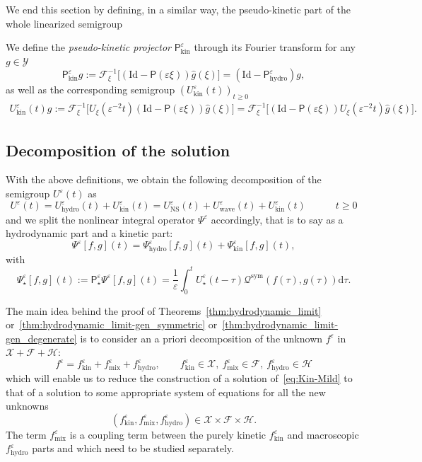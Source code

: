 \documentclass[AHL,Unicode,longabstracts,published]{cedram}
\newcommand{\ns}{\mathrm{NS}}
\newcommand{\hyd}{\mathrm{hydro}}
\newcommand{\mix}{\mathrm{mix}}
\newcommand{\kin}{\mathrm{kin}}
\newcommand{\sym}{\mathrm{sym}}
\newcommand{\Id}{\mathrm{Id}}
\renewcommand{\d}{\mathrm{d}}
\newcommand{\Wave}{\mathrm{wave}}
\newcommand{\FF}{\mathcal{F}}
\newcommand{\PP}{\mathsf{P}}
\newcommand{\QQ}{\mathcal{Q}}
\newcommand{\VV}{\mathcal{Y}}
\newcommand{\FFF}{\mathscr{F}}
\newcommand{\HHH}{\mathscr{H}}
\newcommand{\GGG}{\mathscr{X}}
\newcommand{\SSSs}{\HHH}
\newcommand{\SSSl}{\GGG}
\newcommand{\SSSm}{\FFF}
\newcommand{\SSg}{\VV}
\renewcommand*\ge{\geqslant}
\newcommand*\eps{{\varepsilon}}
\begin{document}
We end this section by defining, in a similar way, the pseudo-kinetic part of the whole linearized semigroup

\begin{defi}\label{def:kinetic_semigroups}
We define the \emph{pseudo-kinetic projector} $\PP_\kin^\eps$ through its Fourier transform for any $g \in \SSg$
\begin{equation*}
\PP_\kin^\eps g := \FF_\xi^{-1} \Big[\left(\Id - \PP(\eps \xi)\right) \widehat{g}(\xi) \Big] = \left(\Id - \PP^\eps_\hyd\right) g,
\end{equation*}
as well as the corresponding semigroup $\left(U^\eps_\kin(t)\right)_{t\ge0}$
\begin{align*}
U^\eps_\kin(t)g := \FF^{-1}_\xi \Big[U_{\xi}\left(\eps^{-2}t\right)\left(\Id - \PP(\eps \xi) \right) \widehat{g}(\xi) \Big]=\FF^{-1}_\xi \Big[\left(\Id - \PP(\eps \xi) \right)U_{\xi}\left(\eps^{-2}t\right)\widehat{g}(\xi) \Big].
\end{align*}
\end{defi}

\subsection{Decomposition of the solution}

With the above definitions, we obtain the following decomposition of the semigroup $U^\eps(t)$ as
\begin{equation}\label{eq:decompUeps}
U^\eps(t) = U^\eps_\hyd(t) + U^\eps_\kin(t) =U^\eps_\ns(t)+U^\eps_\Wave(t) + U^\eps_\kin(t)\qquad \quad t\ge0
\end{equation}
and we split the nonlinear integral operator $\Psi^\eps$ accordingly, that is to say as a hydrodynamic part and a kinetic part:
\[
\Psi^\eps[f,g](t) = \Psi^\eps_\hyd [f, g](t) + \Psi^\eps_\kin [f, g](t),
\]
with
\[
\Psi^\eps_\star [f, g](t) := \PP^\eps_\star \Psi^\eps[f,g](t) = \frac{1}{\eps} \int_0^t U^\eps_\star(t - \tau) \QQ^\sym (f(\tau), g(\tau)) \d \tau.
\]

The main idea behind the proof of Theorems~\ref{thm:hydrodynamic_limit} or~\ref{thm:hydrodynamic_limit-gen_symmetric} or~\ref{thm:hydrodynamic_limit-gen_degenerate} is to consider an a priori decomposition of the unknown $f^\eps$ in $\SSSl + \SSSm + \SSSs$:
\begin{equation}\label{eq:decompfeps}
f^\eps = f^\eps_\kin + f^\eps_\mix + f^\eps_\hyd, \qquad f^\eps_\kin \in \SSSl,~f^\eps_\mix \in \SSSm,~f^\eps_\hyd \in \SSSs
\end{equation}
which will enable us to reduce the construction of a solution of~\eqref{eq:Kin-Mild} to that of a solution to some appropriate system of equations for all the new unknowns
\[
\left(f^\eps_\kin,f^\eps_\mix,f^\eps_\hyd\right) \in \SSSl\times \SSSm\times \SSSs.
\]
The term $f^\eps_\mix$ is a coupling term between the purely kinetic $f^\eps_\kin$ and macroscopic $f^\eps_\hyd$ parts and which need to be studied separately.
\end{document}
